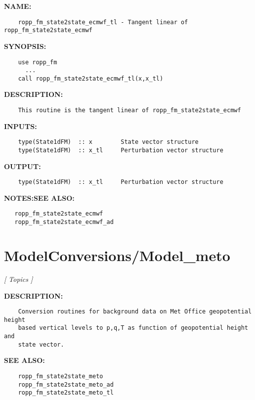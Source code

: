 \label{ch:robo60}
\label{ch:Model_ecmwf_ropp_fm_state2state_ecmwf_tl}
\textbf{NAME:}\hspace{0.08in}\begin{Verbatim}
    ropp_fm_state2state_ecmwf_tl - Tangent linear of ropp_fm_state2state_ecmwf
\end{Verbatim}
\textbf{SYNOPSIS:}\hspace{0.08in}\begin{Verbatim}
    use ropp_fm
      ...
    call ropp_fm_state2state_ecmwf_tl(x,x_tl)
\end{Verbatim}
\textbf{DESCRIPTION:}\hspace{0.08in}\begin{Verbatim}
    This routine is the tangent linear of ropp_fm_state2state_ecmwf
\end{Verbatim}
\textbf{INPUTS:}\hspace{0.08in}\begin{Verbatim}
    type(State1dFM)  :: x        State vector structure
    type(State1dFM)  :: x_tl     Perturbation vector structure
\end{Verbatim}
\textbf{OUTPUT:}\hspace{0.08in}\begin{Verbatim}
    type(State1dFM)  :: x_tl     Perturbation vector structure
\end{Verbatim}
\textbf{NOTES:}\hspace{0.08in}\textbf{SEE ALSO:}\hspace{0.08in}\begin{Verbatim}
   ropp_fm_state2state_ecmwf
   ropp_fm_state2state_ecmwf_ad
\end{Verbatim}
\section{ModelConversions/Model\_meto}
\textsl{[ Topics ]}

\label{ch:robo65}
\label{ch:ModelConversions_Model_meto}
\textbf{DESCRIPTION:}\hspace{0.08in}\begin{Verbatim}
    Conversion routines for background data on Met Office geopotential height
    based vertical levels to p,q,T as function of geopotential height and
    state vector.
\end{Verbatim}
\textbf{SEE ALSO:}\hspace{0.08in}\begin{Verbatim}
    ropp_fm_state2state_meto
    ropp_fm_state2state_meto_ad
    ropp_fm_state2state_meto_tl
\end{Verbatim}
